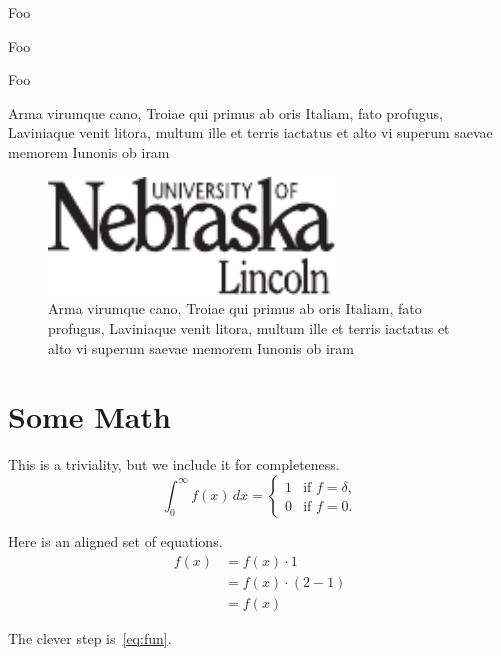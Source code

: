 \documentclass[phd, print]{nuthesis}
\begin{document}
\begin{table}[h]
  \centering

  \begin{compactitem}[\checkmark]
    \item Foo
    \item Foo
    \item Foo
    \end{compactitem}

  \caption{Arma virumque cano, Troiae qui primus ab oris Italiam, fato profugus,
Laviniaque venit litora, multum ille et terris iactatus et alto vi
superum saevae memorem Iunonis ob iram}
  \label{tab:list}
\end{table}

\begin{figure}[h]
  \centering
  \includegraphics[width=3in]{figures/unl}
  \caption{Arma virumque cano, Troiae qui primus ab oris Italiam, fato profugus,
Laviniaque venit litora, multum ille et terris iactatus et alto vi
superum saevae memorem Iunonis ob iram}
  \label{fig:test}
\end{figure}

\chapter{Some Math}\label{chap:math}

This is a triviality, but we include it for completeness.
\begin{equation}
\int_0^\infty f(x) \, dx =
\begin{cases} 1 & \mbox{if $f=\delta$,} \\
0 & \mbox{if $f=0$.} \end{cases}
\end{equation}

Here is an aligned set of equations.
\begin{align}
f(x) &= f(x) \cdot 1 \\
     &= f(x) \cdot (2-1)\label{eq:fun}\\
     &= f(x)
\end{align}

The clever step is~\eqref{eq:fun}.
\end{document}
